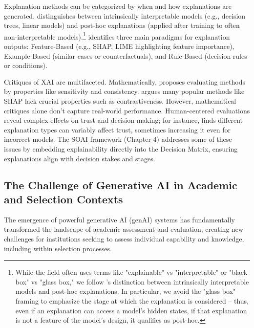 Explanation methods can be categorized by when and how explanations are generated. \textcite{molnar_interpretable_2019} distinguishes between intrinsically interpretable models (e.g., decision trees, linear models) and post-hoc explanations (applied after training to often non-interpretable models).\footnote{While the field often uses terms like "explainable" vs "interpretable" or "black box" vs "glass box," we follow \textcite{molnar_interpretable_2019}'s distinction between intrinsically interpretable models and post-hoc explanations. In particular, we avoid the "glass box" framing to emphasize the stage at which the explanation is considered – thus, even if an explanation can access a model's hidden states, if that explanation is not a feature of the model's design, it qualifies as post-hoc.} \textcite{friedrich_taxonomy_2011} identifies three main paradigms for explanation outputs: Feature-Based (e.g., SHAP, LIME highlighting feature importance), Example-Based (similar cases or counterfactuals), and Rule-Based (decision rules or conditions).

Critiques of XAI are multifaceted. Mathematically, \textcite{doshi-velez_towards_2017} proposes evaluating methods by properties like sensitivity and consistency. \textcite{kumar_problems_2020} argues many popular methods like SHAP lack crucial properties such as contrastiveness. However, mathematical critiques alone don't capture real-world performance. Human-centered evaluations reveal complex effects on trust and decision-making; for instance, \textcite{lai_human_2019} finds different explanation types can variably affect trust, sometimes increasing it even for incorrect models. The SOAI framework (Chapter 4) addresses some of these issues by embedding explainability directly into the Decision Matrix, ensuring explanations align with decision stakes and stages.

\subsection{The Challenge of Generative AI in Academic and Selection Contexts}\label{ssec:context_genai}
The emergence of powerful generative AI (genAI) systems has fundamentally transformed the landscape of academic assessment and evaluation, creating new challenges for institutions seeking to assess individual capability and knowledge, including within selection processes.

